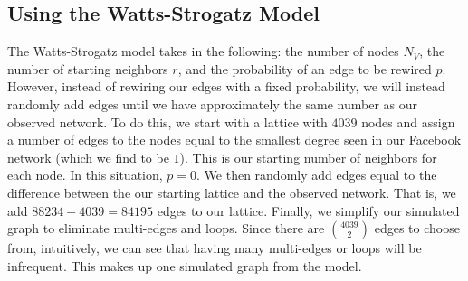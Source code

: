 \documentclass[12pt,twoside]{amherstthesis}
\begin{document}
\begin{Shaded}
\begin{Highlighting}[]
  \StringTok{ }\NormalTok{(}
  \end{Highlighting}
  \end{Shaded}
  
  \subsection{Using the Watts-Strogatz
  Model}\label{using-the-watts-strogatz-model}
  
  The Watts-Strogatz model takes in the following: the number of nodes
  \(N_{V}\), the number of starting neighbors \(r\), and the probability
  of an edge to be rewired \(p\). However, instead of rewiring our edges
  with a fixed probability, we will instead randomly add edges until we
  have approximately the same number as our observed network. To do this,
  we start with a lattice with \(4039\) nodes and assign a number of edges
  to the nodes equal to the smallest degree seen in our Facebook network
  (which we find to be \(1\)). This is our starting number of neighbors
  for each node. In this situation, \(p = 0\). We then randomly add edges
  equal to the difference between the our starting lattice and the
  observed network. That is, we add \(88234 - 4039 = 84195\) edges to our
  lattice. Finally, we simplify our simulated graph to eliminate
  multi-edges and loops. Since there are \(4039 \choose 2\) edges to
  choose from, intuitively, we can see that having many multi-edges or
  loops will be infrequent. This makes up one simulated graph from the
  model.
  
\end{document}
